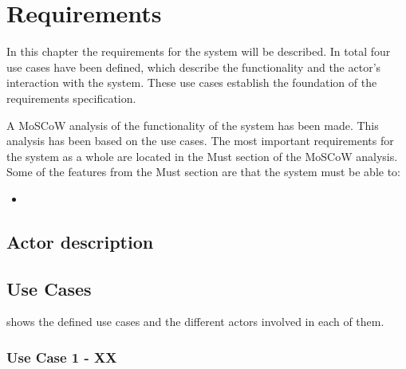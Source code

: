 
\chapter{Requirements}

In this chapter the requirements for the system will be described.
In total four use cases have been defined, which describe the functionality and the actor's interaction with the \systemName system. These use cases establish the foundation of the requirements specification.

A MoSCoW\cite{moscow} analysis of the functionality of the system has been made.
This analysis has been based on the use cases.
The most important requirements for the system as a whole are located in the Must section of the MoSCoW analysis.
Some of the features from the Must section are that the system must be able to:  

\begin{itemize}
	\item 
\end{itemize}

\section{Actor description}

\section{Use Cases}
\label{rap:UC}
 shows the defined use cases and the different actors involved in each of them.


\subsection{Use Case 1 - XX}
